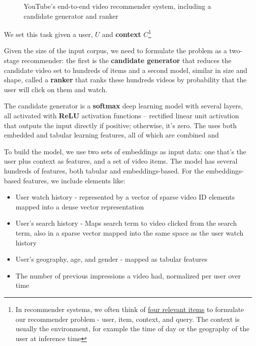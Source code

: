 \documentclass[11pt, table]{diazessay} %
\begin{document}
\begin{sloppypar}
\begin{figure}[H]
\caption{YouTube's end-to-end video recommender system, including a candidate generator and ranker\citep{covington2016deep}}
\end{figure}

We set this task given a user, $U$ and \textbf{context} $C$\footnote{In recommender systems, we often think of \href{https://md.ekstrandom.net/blog/2015/10/search-and-recsys}{four relevant items} to formulate our recommender problem - user, item, context, and query. The context is usually the environment, for example the time of day or the geography of the user at inference time }

Given the size of the input corpus, we need to formulate the problem as a two-stage recommender: the first is the \textbf{candidate generator} that reduces the candidate video set to hundreds of items and a second model, similar in size and shape, called a \textbf{ranker} that ranks these hundreds videos by probability that the user will click on them and watch.

The candidate generator is a \textbf{softmax} deep learning model with several layers, all activated with \textbf{ReLU} activation functions --  rectified linear unit activation that outputs the input directly if positive; otherwise, it's zero.  The uses both embedded and tabular learning features, all of which are combined and 



To build the model, we use two sets of embeddings as input data: one that's the user plus context as features, and a set of video items. The model has several hundreds of features, both tabular and embeddings-based. For the embeddings-based features, we include elements like:

\begin{itemize}
  \item User watch history - represented by a vector of sparse video ID elements mapped into a dense vector representation
  \item User's search history - Maps search term to video clicked from the search term, also in a sparse vector mapped into the same space as the user watch history
  \item User's geography, age, and gender - mapped as tabular features
  \item The number of previous impressions a video had, normalized per user over time
\end{itemize}



\end{sloppypar}
\end{document}
